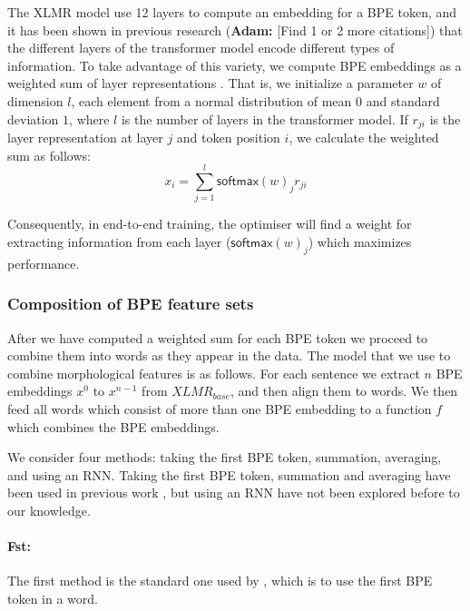 \documentclass[11pt]{article}
\newcommand\adam[1]{(\textbf{Adam:} #1)}
\newcommand\citet{\newcite}
\newcommand\citep{\cite}
\newcommand\softmax{\mathsf{softmax}}
\begin{document}
                The XLMR model use 12 layers to compute an embedding
     for a BPE token, and it has been shown in previous research
     \citep{kondratyukstraka,raganato2018analysis,liu2019linguistic}
     \adam{[Find 1 or 2 more citations]} that the different layers of the
     transformer model encode different types of information. To take
     advantage of this variety, we compute BPE embeddings as a weighted sum of
     layer representations \citep{kondratyukstraka}.  That is, we
     initialize a parameter $w$ of dimension $l$, each element from a normal
     distribution of mean $0$ and standard deviation $1$, where $l$ is
     the number of layers in the transformer model. If $r_{ji}$ is the
     layer representation at layer $j$ and token position $i$, we
     calculate the weighted sum as follows:
    \begin{equation}
		x_i = \sum_{j=1}^{l} \softmax(w)_j r_{ji}
	\end{equation}

        Consequently, in end-to-end training, the optimiser will find
        a weight for extracting information from each layer
        ($\softmax(w)_j$) which maximizes performance.

     \subsubsection{Composition of BPE feature sets}
          After we have computed a weighted sum for each BPE token we
     proceed to combine them into words as they appear in the data.
      The model that we use to combine morphological features is as
     follows. For each sentence we extract $n$ BPE embeddings $x^0$ to
     $x^{n-1}$ from $XLMR_{base}$, and then align them to words.
        We then feed all words which consist of more than one
        BPE embedding to a function $f$ which combines the BPE
        embeddings.

                    We consider four methods: taking the first BPE
     token, summation, averaging, and using an RNN. Taking the first
     BPE token, summation and averaging have been used in previous
     work \citep{sachan2020syntax,kondratyuk2019cross,devlin2018bert},
     but using an RNN have not been explored before to our knowledge.

        \paragraph{Fst:} The first method is the standard one used by
     \citet{devlin2018bert}, which is to use the first BPE token in a word.
    
\end{document}
